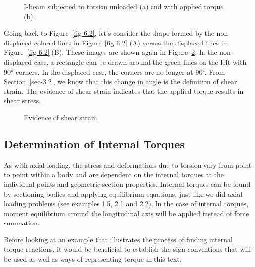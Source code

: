\documentclass[
  letterpaper,
  DIV=11,
  numbers=noendperiod]{scrreprt}
\theoremstyle{definition}
\theoremstyle{remark}
\begin{document}
\begin{figure}


\caption{\label{fig-6.3}I-beam subjected to torsion unloaded (a) and
with applied torque (b).}

\end{figure}%

Going back to Figure~\ref{fig-6.2}, let's consider the shape formed by
the non-displaced colored lines in Figure~\ref{fig-6.2} (A) versus the
displaced lines in Figure~\ref{fig-6.2} (B). These images are shown
again in Figure~\ref{fig-6.4}. In the non-displaced case, a rectangle
can be drawn around the green lines on the left with 90° corners. In the
displaced case, the corners are no longer at 90°. From
Section~\ref{sec-3.2}, we know that this change in angle is the
definition of shear strain. The evidence of shear strain indicates that
the applied torque results in shear stress.

\begin{figure}


\caption{\label{fig-6.4}Evidence of shear strain}

\end{figure}%

\subsection{Determination of Internal
Torques}\label{determination-of-internal-torques}

As with axial loading, the stress and deformations due to torsion vary
from point to point within a body and are dependent on the internal
torques at the individual points and geometric section properties.
Internal torques can be found by sectioning bodies and applying
equilibrium equations, just like we did axial loading problems (see
examples 1.5, 2.1 and 2.2). In the case of internal torques, moment
equilibrium around the longitudinal axis will be applied instead of
force summation.

Before looking at an example that illustrates the process of finding
internal torque reactions, it would be beneficial to establish the sign
conventions that will be used as well as ways of representing torque in
this text.
\end{document}
